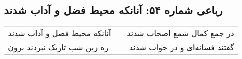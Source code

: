 \begin{center}
\section*{رباعی شماره ۵۴: آنانکه محیط فضل و آداب شدند}
\label{sec:sh054}
\begin{longtable}{l p{0.5cm} r}
آنانکه محیط فضل و آداب شدند
&&
در جمع کمال شمع اصحاب شدند
\\
ره زین شب تاریک نبردند برون
&&
گفتند فسانه‌ای و در خواب شدند
\\
\end{longtable}
\end{center}
